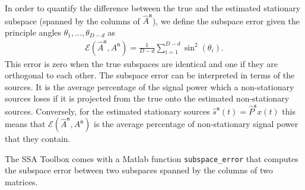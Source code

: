 \documentclass{article}
\newcommand{\1}{\ensuremath{\mathds{1}}}
\newcommand{\s}{\ensuremath{\mathfrak{s}}}
\newcommand{\n}{\ensuremath{\mathfrak{n}}}
\newcommand{\0}{\ensuremath{0}}
\begin{document}
\begin{appendices}
In order to quantify the difference between the true and the estimated stationary subspace 
(spanned by the columns of $\hat{A}^\n$), we define the subspace error given the principle 
angles $\theta_1, \ldots, \theta_{D-d}$ as 
\begin{align*}
	\mathcal{E}(\hat{A}^\n , A^\n ) = \frac{1}{D-d} \sum_{i=1}^{D-d} \sin^2 (\theta_i) .
\end{align*}
This error is zero when the true subspaces are identical and one if they are orthogonal to 
each other. The subspace error can be interpreted in terms of the sources. It is the 
average percentage of the signal power which a non-stationary sources loses if it is projected 
from the true onto the estimated non-stationary sources. Conversely, for the estimated stationary
sources $\hat{s}^\n(t) = \hat{P}^\s x(t)$ this means that $\mathcal{E}(\hat{A}^\n , A^\n )$ 
is the average percentage of non-stationary signal power that they contain. 

The SSA Toolbox comes with a Matlab function \texttt{subspace\_error} that computes the subspace
error between two subspaces spanned by the columns of two matrices. 

\end{appendices}


\newpage


\end{document}
